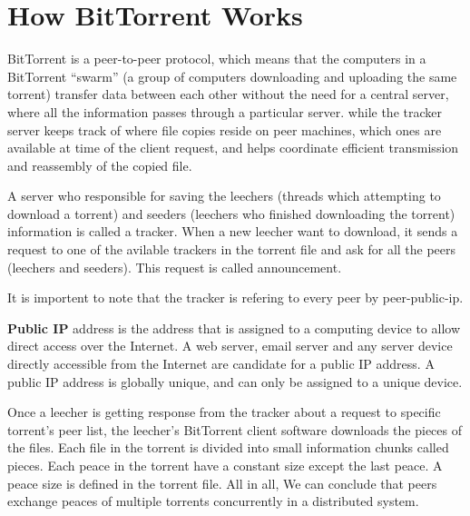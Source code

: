 \documentclass[11pt]{article}
\begin{document}
  \section*{How BitTorrent Works}
  \begin{flushleft}

    BitTorrent is a peer-to-peer protocol, which means that the computers in a BitTorrent “swarm” (a group of computers downloading and uploading the same torrent) transfer data between each other without the need for a central server, where all the information passes through a particular server.
    while the tracker server keeps track of where file copies reside on peer machines, which ones are available at time of the client request, and helps coordinate efficient transmission and reassembly of the copied file.

  \end{flushleft}
  \begin{flushleft}

    A server who responsible for saving the leechers (threads which attempting to download a torrent) and seeders (leechers who finished downloading the torrent) information is called a tracker. When a new leecher want to download, it sends a request to one of the avilable trackers in the torrent file and ask for all the peers (leechers and seeders). This request is called announcement.

  \end{flushleft}
  \begin{flushleft}

    It is importent to note that the tracker is refering to every peer by peer-public-ip.

  \end{flushleft}
  \begin{flushleft}

    \textbf{Public IP} address is the address that is assigned to a computing device to allow direct access over the Internet. A web server, email server and any server device directly accessible from the Internet are candidate for a public IP address. A public IP address is globally unique, and can only be assigned to a unique device.

  \end{flushleft}
  \begin{flushleft}

    Once a leecher is getting response from the tracker about a request to specific torrent's peer list, the leecher's BitTorrent client software downloads the pieces of the files. Each file in the torrent is divided into small information chunks called pieces. Each peace in the torrent have a constant size except the last peace. A peace size is defined in the torrent file. All in all, We can conclude that peers exchange peaces of multiple torrents concurrently in a distributed system.

  \end{flushleft}
\end{document}
